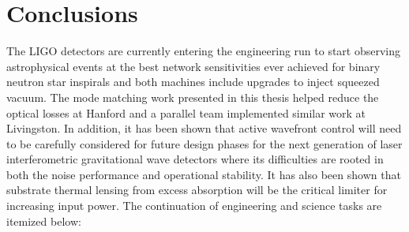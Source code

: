 \chapter{Conclusions}
The LIGO detectors are currently entering the engineering run to start observing astrophysical events at the best network sensitivities ever achieved for binary neutron star inspirals and both machines include upgrades to inject squeezed vacuum. The mode matching work presented in this thesis helped reduce the optical losses at Hanford and a parallel team implemented similar work at Livingston.  In addition, it has been shown that active wavefront control will need to be carefully considered for future design phases for the next generation of laser interferometric gravitational wave detectors where its difficulties are rooted in both the noise performance and operational stability.  It has also been shown that substrate thermal lensing from excess absorption will be the critical limiter for increasing input power.  The continuation of engineering and science tasks are itemized below:

